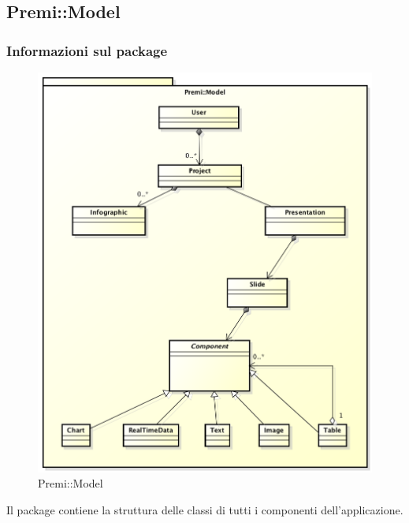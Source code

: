 \newpage


\subsection{Premi::Model}
	\subsubsection*{Informazioni sul package}
		\begin{figure}[h]
			\centering
			\includegraphics[width=0.9\linewidth]{img/back-end_logic-tier_premi_model}
			\caption[Premi::Model]{Premi::Model}
		\end{figure}
		Il package contiene la struttura delle classi di tutti i componenti dell'applicazione.
	
